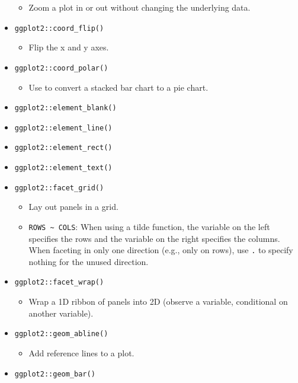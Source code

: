 \documentclass[
]{book}
\providecommand{\tightlist}{%
  \setlength{\itemsep}{0pt}\setlength{\parskip}{0pt}}
\begin{document}
\begin{itemize}
  \begin{itemize}
  \tightlist
  \item
    Zoom a plot in or out without changing the underlying data.
  \end{itemize}
\item
  \texttt{ggplot2::coord\_flip()}

  \begin{itemize}
  \tightlist
  \item
    Flip the x and y axes.
  \end{itemize}
\item
  \texttt{ggplot2::coord\_polar()}

  \begin{itemize}
  \tightlist
  \item
    Use to convert a stacked bar chart to a pie chart.
  \end{itemize}
\item
  \texttt{ggplot2::element\_blank()}
\item
  \texttt{ggplot2::element\_line()}
\item
  \texttt{ggplot2::element\_rect()}
\item
  \texttt{ggplot2::element\_text()}
\item
  \texttt{ggplot2::facet\_grid()}

  \begin{itemize}
  \tightlist
  \item
    Lay out panels in a grid.
  \item
    \texttt{ROWS\ \textasciitilde{}\ COLS}: When using a tilde function, the variable on the left specifies the rows and the variable on the right specifies the columns. When faceting in only one direction (e.g., only on rows), use \texttt{.} to specify nothing for the unused direction.
  \end{itemize}
\item
  \texttt{ggplot2::facet\_wrap()}

  \begin{itemize}
  \tightlist
  \item
    Wrap a 1D ribbon of panels into 2D (observe a variable, conditional on another variable).
  \end{itemize}
\item
  \texttt{ggplot2::geom\_abline()}

  \begin{itemize}
  \tightlist
  \item
    Add reference lines to a plot.
  \end{itemize}
\item
  \texttt{ggplot2::geom\_bar()}


\end{itemize}
\end{document}
